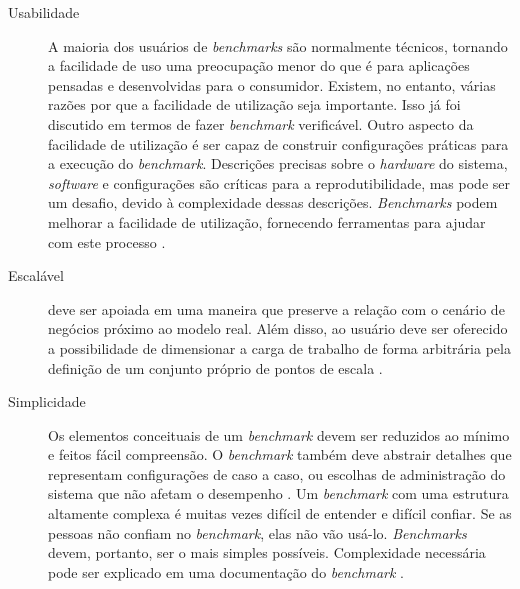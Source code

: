 \begin{description}
	\item[Usabilidade] A maioria dos usuários de \textit{benchmarks} são normalmente técnicos, tornando a facilidade de uso uma preocupação menor do que é para aplicações pensadas e desenvolvidas para o consumidor. Existem, no entanto, várias razões por que a facilidade de utilização seja importante.
	Isso já foi discutido em termos de fazer \textit{benchmark} verificável. Outro aspecto da facilidade de utilização é ser capaz de construir configurações práticas para a execução do \textit{benchmark}. Descrições precisas sobre o \textit{hardware} do sistema, \textit{software} e configurações são críticas para a reprodutibilidade, mas pode ser um desafio, devido à complexidade dessas descrições.
	\textit{Benchmarks} podem melhorar a facilidade de utilização, fornecendo ferramentas para ajudar com este processo \cite{Kistowski2015}. 
	
	\item[Escalável] deve ser apoiada em uma maneira que preserve a relação com o cenário de negócios próximo ao modelo real. Além disso, ao usuário deve ser oferecido a possibilidade de dimensionar a carga de trabalho de forma arbitrária pela definição de um conjunto próprio de pontos de escala \cite{Marco2012}. 
	
	\item[Simplicidade] Os elementos conceituais de um \textit{benchmark} devem ser reduzidos ao mínimo e feitos fácil compreensão. O \textit{benchmark} também deve abstrair detalhes que representam configurações de caso a caso, ou escolhas de administração do sistema que não afetam o desempenho \cite{Chen2014}. Um \textit{benchmark} com uma estrutura altamente complexa é muitas vezes difícil de entender e difícil confiar. Se as pessoas não confiam no \textit{benchmark}, elas não vão usá-lo. \textit{Benchmarks} devem, portanto, ser o mais simples possíveis. Complexidade necessária pode ser explicado em uma documentação do \textit{benchmark} \cite{Weber2014}.
	

\end{description}
